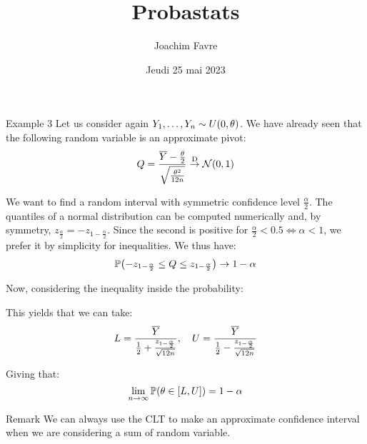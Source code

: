 \documentclass[a4paper]{article}
\title{Probastats}
\author{Joachim Favre}
\date{Jeudi 25 mai 2023}
\begin{document}
\maketitle


\begin{parag}{Example 3}
    Let us consider again $Y_1, \ldots, Y_n \followsdistr U\left(0, \theta\right)$. We have already seen that the following random variable is an approximate pivot: 
    \[Q = \frac{\bar{Y} - \frac{\theta}{2}}{\sqrt{\frac{\theta^2}{12 n}}} \over{\to}{D} \mathcal{N}\left(0, 1\right)\]

    We want to find a random interval with symmetric confidence level $\frac{\alpha}{2}$. The quantiles of a normal distribution can be computed numerically and, by symmetry, $z_{\frac{\alpha}{2}} = -z_{1 - \frac{\alpha}{2}}$. Since the second is positive for $\frac{\alpha}{2} < 0.5 \iff \alpha < 1$, we prefer it by simplicity for inequalities. We thus have: 
    \[\prob\left(-z_{1 - \frac{\alpha}{2}} \leq Q \leq z_{1 - \frac{\alpha}{2}}\right) \to 1 - \alpha\]
    
    Now, considering the inequality inside the probability: 

    This yields that we can take: 
    \[L = \frac{\overline{Y}}{\frac{1}{2} + \frac{z_{1 - \frac{\alpha}{2}}}{\sqrt{12 n}}}, \quad U = \frac{\overline{Y}}{\frac{1}{2} - \frac{z_{1 - \frac{\alpha}{2}}}{\sqrt{12 n}}}\]
    
    Giving that: 
    \[\lim_{n \to \infty} \prob\left(\theta \in \left[L, U\right]\right) = 1 - \alpha\]

    \begin{subparag}{Remark}
        We can always use the CLT to make an approximate confidence interval when we are considering a sum of random variable.
    \end{subparag}
\end{parag}
\end{document}
